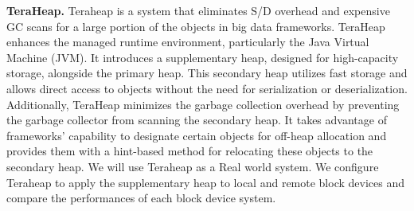 \documentclass[nonacm,sigplan]{acmart}
\begin{document}
\textbf{TeraHeap.} Teraheap is a system that eliminates S/D overhead and expensive GC scans for a
large portion of the objects in big data frameworks. TeraHeap enhances the
managed runtime environment, particularly the Java Virtual Machine (JVM). It
introduces a supplementary heap, designed for high-capacity storage, alongside
the primary heap. This secondary heap utilizes fast storage and allows direct
access to objects without the need for serialization or deserialization.
Additionally, TeraHeap minimizes the garbage collection overhead by preventing
the garbage collector from scanning the secondary heap. It takes advantage of
frameworks' capability to designate certain objects for off-heap allocation and
provides them with a hint-based method for relocating these objects to the
secondary heap. We will use Teraheap as a Real world system. We configure Teraheap to apply the supplementary heap to local and remote block devices and compare the performances of each block device system.
\end{document}

